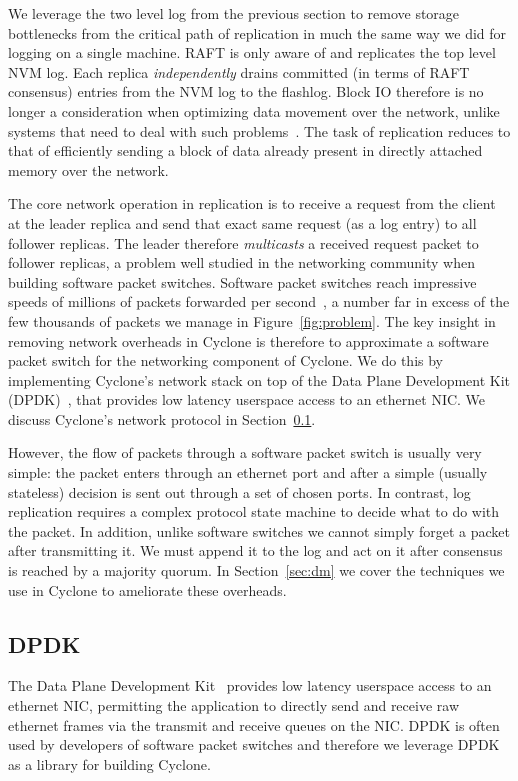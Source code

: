 \documentclass[letterpaper,twocolumn,10pt]{article}
\begin{document}
We leverage the two level log from the previous section to remove storage
bottlenecks from the critical path of replication in much the same way we did
for logging on a single machine. RAFT is only aware of and replicates the top
level NVM log. Each replica \emph{independently} drains committed (in terms of
RAFT consensus) entries from the NVM log to the flashlog. Block IO therefore is
no longer a consideration when optimizing data movement over the network, unlike
systems that need to deal with such problems~\cite{reflex}. The task of
replication reduces to that of efficiently sending a block of data already
present in directly attached memory over the network. 

The core network operation in replication is to receive a request from the
client at the leader replica and send that exact same request (as a log entry)
to all follower replicas. The leader therefore \emph{multicasts} a received
request packet to follower replicas, a problem well studied in the networking
community when building software packet switches. Software packet switches reach
impressive speeds of millions of packets forwarded per second~\cite{dpdk_perf}, 
a number far in excess of the few thousands of packets we manage in
Figure~\ref{fig:problem}. The key insight in removing network overheads in
Cyclone is therefore to approximate a software packet switch for the networking
component of Cyclone. We do this by implementing Cyclone's network stack on top
of the Data Plane Development Kit (DPDK)~\cite{dpdk}, that provides low latency
userspace access to an ethernet NIC. We discuss Cyclone's network protocol in
Section~\ref{sec:netprot}.

However, the flow of packets through a software packet switch is usually very
simple: the packet enters through an ethernet port and after a simple (usually
stateless) decision is sent out through a set of chosen ports.  In contrast, log
replication requires a complex protocol state machine to decide what to do with
the packet. In addition, unlike software switches we cannot simply forget a
packet after transmitting it. We must append it to the log and act on it after
consensus is reached by a majority quorum. In Section~\ref{sec:dm} we cover the
techniques we use in Cyclone to ameliorate these overheads.

\subsection{DPDK}
\label{sec:netprot}
The Data Plane Development Kit~\cite{dpdk} provides low latency userspace access
to an ethernet NIC, permitting the application to directly send and receive raw
ethernet frames via the transmit and receive queues on the NIC. DPDK is often
used by developers of software packet switches and therefore we leverage
DPDK as a library for building Cyclone.
\end{document}
